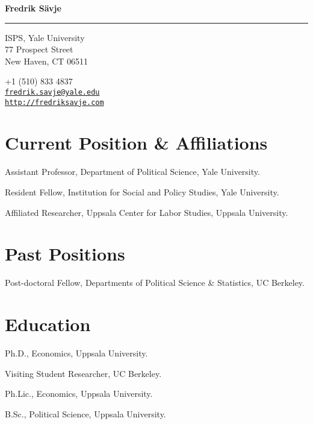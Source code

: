 \documentclass[10pt,letterpaper]{article}
\newenvironment{datelist}{
	\begin{list}{}{
		\setlength{\parskip}{0pt}
		\setlength{\itemsep}{4pt}
		\setlength{\parsep}{0.3em}
		\setlength{\leftmargin}{6em}
		\setlength{\labelwidth}{6em}
		\setlength{\labelsep}{1.5em}
		}
	}{
\end{list}
}
\newcommand{\dateitem}[2][]{\item[{#1}] {#2}}
\newenvironment{infolist}{
	\begin{list}{}{
		\setlength{\parskip}{0pt}
		\setlength{\itemsep}{4pt}
		\setlength{\parsep}{0.3em}
		\setlength{\leftmargin}{1.6em}
		\setlength{\labelwidth}{0pt}
		}
	}{
\end{list}
}
\newcommand{\infoitem}[1]{\item {#1}}
\begin{document}
	{\huge \bf Fredrik Sävje}

	\rule{\textwidth}{1pt}

	\bigskip


	\begin{minipage}[t]{0.495\textwidth}
		ISPS, Yale University \\
		77 Prospect Street \\
		New Haven, CT 06511
	\end{minipage}
	\begin{minipage}[t]{0.495\textwidth}
		+1 (510) 833 4837 \\
		\href{mailto:fredrik.savje@yale.edu}{\texttt{fredrik.savje@yale.edu}} \\
		\href{http://fredriksavje.com}{\texttt{http://fredriksavje.com}}
	\end{minipage}

	\bigskip


	\section*{Current Position \& Affiliations}

	\begin{infolist}
		\infoitem{Assistant Professor, Department of Political Science, Yale University.}
		\infoitem{Resident Fellow, Institution for Social and Policy Studies, Yale University.}
		\infoitem{Affiliated Researcher, Uppsala Center for Labor Studies, Uppsala University.}
	\end{infolist}


	\section*{Past Positions}

	\begin{datelist}
		\dateitem[2015--2017]{Post-doctoral Fellow, Departments of Political Science \& Statistics, UC Berkeley.}
	\end{datelist}


	\section*{Education}

	\begin{datelist}
		\dateitem[2015]{Ph.D., Economics, Uppsala University.}
		\dateitem[2013--2014]{Visiting Student Researcher, UC Berkeley.}
		\dateitem[2013]{Ph.Lic., Economics, Uppsala University.}
		\dateitem[2010]{B.Sc., Political Science, Uppsala University.}
	\end{datelist}
\end{document}

